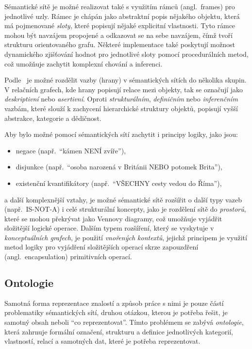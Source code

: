 Sémantické sítě je možné realizovat také s využitím rámců (angl.~frames) pro jednotlivé uzly.
Rámec je chápán jako abstraktní popis nějakého objektu, která má pojmenované \emph{sloty}, které popisují nějaké explicitní vlastnosti.
Tyto rámce mohou být navzájem propojené a odkazovat se na sebe navzájem, čímž tvoří strukturu orientovaného grafu.
Některé implementace také poskytují možnost dynamického zjišťování hodnot pro jednotlivé sloty pomocí procedurálních metod,
což umožňuje zachytit komplexní chování a inferenci.~\cite{semantic-nets-LEHMANN19921}

Podle~\cite{semantic-nets-LEHMANN19921} je možné rozdělit vazby (hrany) v sémantických sítích do několika skupin.
V relačních grafech, kde hrany popisují relace mezi objekty, tak se označují jako \emph{deskriptivní} nebo \emph{asertivní}.
Oproti \emph{strukturálním}, \emph{definičním} nebo \emph{inferenčním} vazbám, které slouží k zachycení hierarchické struktury objektů,
popisují vyšší abstrakce, kategorie a dědičnost.~\cite{semantic-nets-LEHMANN19921}

Aby bylo možné pomocí sémantických sítí zachytit i principy logiky, jako jsou:
\begin{itemize}
	\item negace (např.~\enquote{kámen NENÍ zvíře}),
	\item disjunkce (např.~\enquote{osoba narozená v Británii NEBO potomek Brita}),
	\item existenční kvantifikátory (např.~\enquote{VŠECHNY cesty vedou do Říma}),
\end{itemize}
a další komplexnější vztahy, je možné sémantické sítě rozšířit o další typy vazeb (např.~IS-NOT-A) i celé strukturální koncepty,
jako je rozdělení sítě do \emph{prostorů}, které se mohou překrývat jako Vennovy diagramy, což umožňuje vyjádřit složitější logické operace.
Dalším typem rozšíření, který se vyskytuje v \emph{konceptuálních grafech}, je použití \emph{vnořených kontextů},
jejichž principem je využití metod logiky pro vyjádření složitějších operací skrze zapouzdření (angl.~encapsulation) primitivních operací.~\cite{semantic-nets-LEHMANN19921}

\subsection{Ontologie}
Samotná forma reprezentace znalostí a způsob práce s nimi je pouze částí problematiky sémantických sítí,
druhou otázkou, kterou je potřeba řešit, je samotný obsah neboli \enquote{co reprezentovat}.
Tímto problémem se zabývá \emph{ontologie}, která zahrnuje formální označení, strukturu a definice jednotlivých kategorií,
vlastností, relací a samotných dat, které je potřeba reprezentovat.

